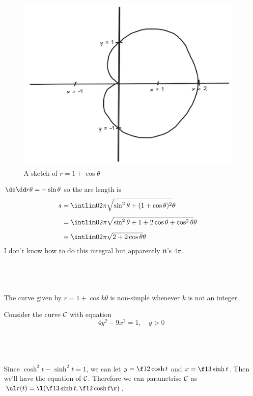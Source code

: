 \documentclass[a4paper]{article}
\begin{document}
\begin{figure}[h]
	\centering
	\includegraphics[scale=0.3]{Q1b}
	\caption{A sketch of $r = 1 + \cos\theta$}
\end{figure}

$\ds\dd r\theta = -\sin\theta$ so the arc length is \begin{align*}
s &= \intlim 0{2\pi} {\sqrt{\sin^2 \theta + (1 + \cos\theta)^2}} \theta\\[1ex]
&= \intlim 0{2\pi} {\sqrt{\sin^2 \theta + 1 + 2\cos\theta + \cos^2 \theta}} \theta\\[1ex]
&= \intlim 0{2\pi} {\sqrt{2 + 2\cos\theta}} \theta
\end{align*}
I don't know how to do this integral but apparently it's $4\pi$.

\subsection{~}

The curve given by $r = 1 + \cos k\theta$ is non-simple whenever $k$ is not an integer.


Consider the curve $\cal C$ with equation $$\quad 4y^2 - 9x^2 = 1, \quad y > 0$$

\subsection{~}

Since $\cosh^2 t - \sinh^2 t = 1$, we can let $y = \f12 \cosh t$ and $x = \f13 \sinh t$. Then we'll have the equation of $\cal C$. Therefore we can parametrise $\cal C$ as $\ul r(t) = \l( \f13 \sinh t, \f12 \cosh t \r)$.
\end{document}
